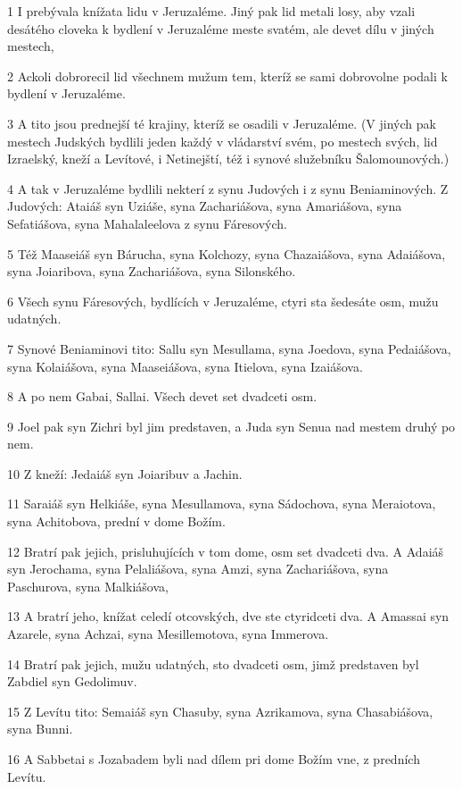 \par 1 I prebývala knížata lidu v Jeruzaléme. Jiný pak lid metali losy, aby vzali desátého cloveka k bydlení v Jeruzaléme meste svatém, ale devet dílu v jiných mestech,
\par 2 Ackoli dobrorecil lid všechnem mužum tem, kteríž se sami dobrovolne podali k bydlení v Jeruzaléme.
\par 3 A tito jsou prednejší té krajiny, kteríž se osadili v Jeruzaléme. (V jiných pak mestech Judských bydlili jeden každý v vládarství svém, po mestech svých, lid Izraelský, kneží a Levítové, i Netinejští, též i synové služebníku Šalomounových.)
\par 4 A tak v Jeruzaléme bydlili nekterí z synu Judových i z synu Beniaminových. Z Judových: Ataiáš syn Uziáše, syna Zachariášova, syna Amariášova, syna Sefatiášova, syna Mahalaleelova z synu Fáresových.
\par 5 Též Maaseiáš syn Bárucha, syna Kolchozy, syna Chazaiášova, syna Adaiášova, syna Joiaribova, syna Zachariášova, syna Silonského.
\par 6 Všech synu Fáresových, bydlících v Jeruzaléme, ctyri sta šedesáte osm, mužu udatných.
\par 7 Synové Beniaminovi tito: Sallu syn Mesullama, syna Joedova, syna Pedaiášova, syna Kolaiášova, syna Maaseiášova, syna Itielova, syna Izaiášova.
\par 8 A po nem Gabai, Sallai. Všech devet set dvadceti osm.
\par 9 Joel pak syn Zichri byl jim predstaven, a Juda syn Senua nad mestem druhý po nem.
\par 10 Z kneží: Jedaiáš syn Joiaribuv a Jachin.
\par 11 Saraiáš syn Helkiáše, syna Mesullamova, syna Sádochova, syna Meraiotova, syna Achitobova, prední v dome Božím.
\par 12 Bratrí pak jejich, prisluhujících v tom dome, osm set dvadceti dva. A Adaiáš syn Jerochama, syna Pelaliášova, syna Amzi, syna Zachariášova, syna Paschurova, syna Malkiášova,
\par 13 A bratrí jeho, knížat celedí otcovských, dve ste ctyridceti dva. A Amassai syn Azarele, syna Achzai, syna Mesillemotova, syna Immerova.
\par 14 Bratrí pak jejich, mužu udatných, sto dvadceti osm, jimž predstaven byl Zabdiel syn Gedolimuv.
\par 15 Z Levítu tito: Semaiáš syn Chasuby, syna Azrikamova, syna Chasabiášova, syna Bunni.
\par 16 A Sabbetai s Jozabadem byli nad dílem pri dome Božím vne, z predních Levítu.
